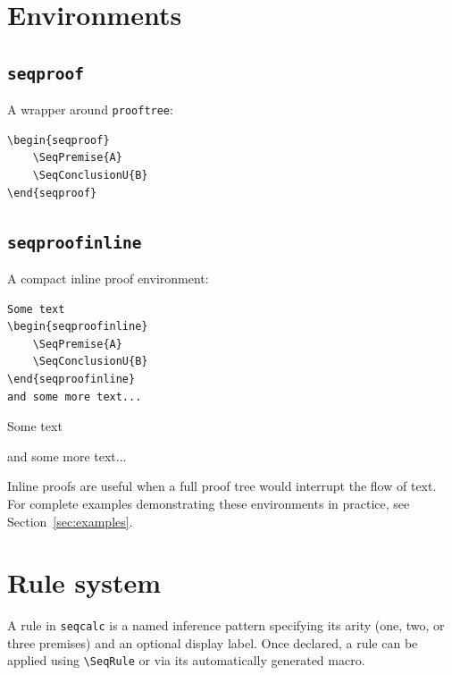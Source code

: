 \documentclass[a4paper,1pt]{article}
\begin{document}
\section{Environments}
\subsection{\texttt{seqproof}}
A wrapper around \texttt{prooftree}:
\begin{tcolorbox}[
    seqexample,
    title={\texttt{seqproof}}
]
\begin{lstlisting}
\begin{seqproof}
    \SeqPremise{A}
    \SeqConclusionU{B}
\end{seqproof}
\end{lstlisting}
\tcblower
    \begin{seqproof}
    \end{seqproof}
\end{tcolorbox}

\subsection{\texttt{seqproofinline}}
A compact inline proof environment:
\begin{tcolorbox}[
    seqexample,
    title={\texttt{seqproofinline}}
]
\begin{lstlisting}
Some text 
\begin{seqproofinline}
    \SeqPremise{A}
    \SeqConclusionU{B}
\end{seqproofinline}
and some more text...
\end{lstlisting}
\tcblower
    Some text 
    \begin{seqproofinline}
    \end{seqproofinline}
    and some more text...
\end{tcolorbox}
\noindent Inline proofs are useful when a full proof tree would interrupt the flow of text.\\
For complete examples demonstrating these environments in practice, see Section~\ref{sec:examples}.

\section{Rule system}
A rule in \texttt{seqcalc} is a named inference pattern specifying its arity (one, two, or three premises) and an optional display label. Once declared, a rule can be applied using \texttt{\textbackslash SeqRule} or via its automatically generated macro.
\end{document}
